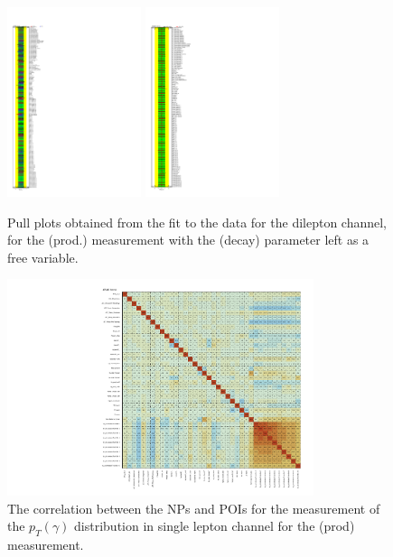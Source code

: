 \begin{figure}[ht]
  \centering
  \includegraphics[width=0.35\textwidth]{figures/diff_xsec/dilep_tty_prod_mu_blinded/compare_NP_pulls/compare_NP_dilep_fits_detall_dphill_eta/NuisPar_comp.pdf}
  \quad \quad
  \includegraphics[width=0.35\textwidth]{figures/diff_xsec/dilep_tty_prod_mu_blinded/compare_NP_pulls/compare_NP_dilep_fits_drphb_drlj/NuisPar_comp.pdf}
  \caption{Pull plots obtained from the fit to the data for the dilepton channel, for the \tty (prod.) measurement
  with the \tty (decay) parameter left as a free variable.}
  \label{fig:pull_plot_pt_tty_dec_free_dilep_mu_blinded_2}
\end{figure}
\FloatBarrier



\begin{figure}[ht]
  \centering
  \includegraphics[width=0.8\textwidth]{figures/diff_xsec/ljet_tty_prod_mu_blinded/correlations/tty1l_pt_all_syst/CorrMatrix.pdf}
  \caption{The correlation between the NPs and POIs for the measurement of 
  the $p_T(\gamma)$ distribution in single lepton channel for the \tty(prod) measurement.}
  \label{fig:NP-corr_ljet_mu_blinded}
\end{figure}
\FloatBarrier


